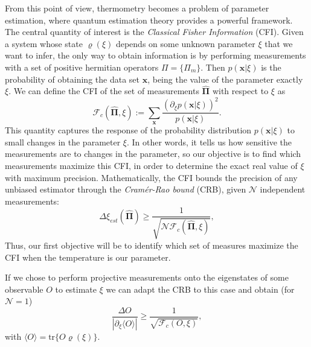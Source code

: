 From this point of view, thermometry becomes a problem of parameter estimation, where quantum estimation theory provides a powerful framework. The central quantity of interest is the \textit{Classical Fisher Information} (CFI). Given a system whose state $\mathcal{\varrho}(\xi)$ depends on some unknown parameter $\xi$ that we want to infer, the only way to obtain information is by performing measurements with a set of positive hermitian operators $\Pi=\{\Pi_m\}$. Then $p(\mathbf{x}|\xi)$ is the probability of obtaining the data set $\mathbf{x}$, being the value of the parameter exactly $\xi$. We can define the CFI of the set of measurements $\mathbf{\widehat\Pi}$ with respect to $\xi$ as
\begin{equation}
    \mathcal{F}_c(\mathbf{\widehat{\Pi}}, \xi) :=  \sum_{\mathbf{x}} \frac{(\partial_\xi p(\mathbf{x}|\xi))^2}{p(\mathbf{x}|\xi)}.
    \label{fisher}
\end{equation}
This quantity captures the response of the probability distribution $p(\mathbf{x}|\xi)$ to small changes in the parameter $\xi$. In other words, it tells us how sensitive the measurements are to changes in the parameter, so our objective is to find which measurements maximize this CFI, in order to determine the exact real value of $\xi$ with maximum precision.
Mathematically, the CFI bounds the precision of any unbiased estimator through the \textit{Cramér-Rao bound} (CRB), given $\mathcal{N}$ independent measurements:
\begin{equation}
\Delta \xi_{est}(\mathbf{\widehat{\Pi}}) \geq \frac{1}{\sqrt{\mathcal{N}\mathcal{F}_c(\mathbf{\widehat{\Pi}}, \xi)}},
\end{equation}
Thus, our first objective will be to identify which set of measures maximize the CFI when the temperature is our parameter. 

If we chose to perform projective measurements onto the eigenstates of some observable ${O}$ to estimate $\xi$ we can adapt the CRB to this case and obtain (for $\mathcal{N}=1$) \cite{Holevo2011} \cite{Kraus1983} \cite{Toth2014}
\begin{equation}\label{Delta O}
\frac{\Delta {O}}{\left|\partial_\xi\langle{O}\rangle\right|} \geq \frac{1}{\sqrt{\mathcal{F}_c({O}, \xi)}},
\end{equation}
with $\langle{O}\rangle=\text{tr}\{{O}{\varrho}(\xi)\}$.


